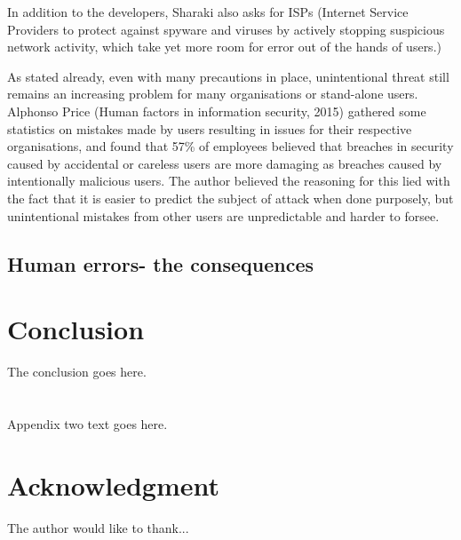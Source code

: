 \documentclass[journal,comsoc]{IEEEtran}
\begin{document}
In addition to the developers, Sharaki also asks for ISPs (Internet Service Providers to protect against spyware and viruses by actively stopping suspicious network activity, which take yet more room for error out of the hands of users.) \par
As stated already, even with many precautions in place, unintentional threat still remains an increasing problem for many organisations or stand-alone users. Alphonso Price (Human factors in information security, 2015) \cite{human-factors} gathered some statistics on mistakes made by users resulting in issues for their respective organisations, and found that 57\% of employees believed that breaches in security caused by accidental or careless users are more damaging as breaches caused by intentionally malicious users. The author believed the reasoning for this lied with the fact that it is easier to predict the subject of attack when done purposely, but unintentional mistakes from other users are unpredictable and harder to forsee. \par
\subsection{Human errors- the consequences}

\section{Conclusion}
The conclusion goes here.

\appendices

\section{}
Appendix two text goes here.
\section*{Acknowledgment}


The author would like to thank...

\ifCLASSOPTIONcaptionsoff
  \newpage
\fi
\end{document}
